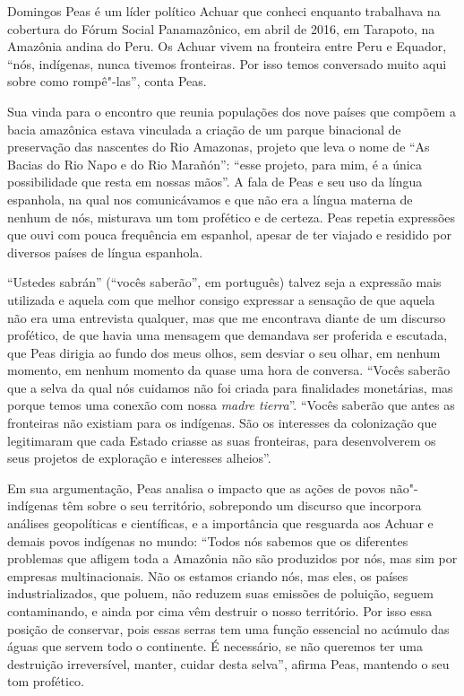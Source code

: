 Domingos Peas é um líder político Achuar que conheci enquanto trabalhava
na cobertura do Fórum Social Panamazônico, em abril de 2016, em
Tarapoto, na Amazônia andina do Peru. Os Achuar vivem na fronteira entre
Peru e Equador, ``nós, indígenas, nunca tivemos fronteiras. Por isso
temos conversado muito aqui sobre como rompê"-las'', conta Peas.

Sua vinda para o encontro que reunia populações dos nove países que
compõem a bacia amazônica estava vinculada a criação de um parque
binacional de preservação das nascentes do Rio Amazonas, projeto que
leva o nome de ``As Bacias do Rio Napo e do Rio Marañón'': ``esse
projeto, para mim, é a única possibilidade que resta em nossas mãos''. A
fala de Peas e seu uso da língua espanhola, na qual nos comunicávamos e
que não era a língua materna de nenhum de nós, misturava um tom
profético e de certeza. Peas repetia expressões que ouvi com pouca
frequência em espanhol, apesar de ter viajado e residido por diversos
países de língua espanhola.

``Ustedes sabrán'' (``vocês saberão'', em português) talvez seja a
expressão mais utilizada e aquela com que melhor consigo expressar a
sensação de que aquela não era uma entrevista qualquer, mas que me
encontrava diante de um discurso profético, de que havia uma mensagem
que demandava ser proferida e escutada, que Peas dirigia ao fundo dos
meus olhos, sem desviar o seu olhar, em nenhum momento, em nenhum
momento da quase uma hora de conversa. ``Vocês saberão que a selva da
qual nós cuidamos não foi criada para finalidades monetárias, mas porque
temos uma conexão com nossa \emph{madre tierra}''. ``Vocês saberão que
antes as fronteiras não existiam para os indígenas. São os interesses da
colonização que legitimaram que cada Estado criasse as suas fronteiras,
para desenvolverem os seus projetos de exploração e interesses
alheios''.

Em sua argumentação, Peas analisa o impacto que as ações de povos
não"-indígenas têm sobre o seu território, sobrepondo um discurso que
incorpora análises geopolíticas e científicas, e a importância que
resguarda aos Achuar e demais povos indígenas no mundo: ``Todos nós
sabemos que os diferentes problemas que afligem toda a Amazônia não são
produzidos por nós, mas sim por empresas multinacionais. Não os estamos
criando nós, mas eles, os países industrializados, que poluem, não
reduzem suas emissões de poluição, seguem contaminando, e ainda por cima
vêm destruir o nosso território. Por isso essa posição de conservar,
pois essas serras tem uma função essencial no acúmulo das águas que
servem todo o continente. É necessário, se não queremos ter uma
destruição irreversível, manter, cuidar desta selva'', afirma Peas,
mantendo o seu tom profético.

